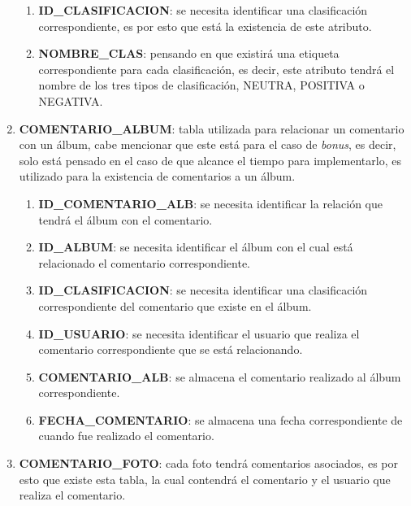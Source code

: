 \documentclass{memoria}
\begin{document}
\begin{enumerate}
	\begin{enumerate}
	\item \textbf{ID\_CLASIFICACION}: se necesita identificar una clasificación correspondiente, es por esto que está la existencia de este atributo.
	\item \textbf{NOMBRE\_CLAS}: pensando en que existirá una etiqueta correspondiente para cada clasificación, es decir, este atributo tendrá el nombre de los tres tipos de clasificación, NEUTRA, POSITIVA o NEGATIVA.
	\end{enumerate}
	
\item \textbf{COMENTARIO\_ALBUM}: tabla utilizada para relacionar un comentario con un álbum, cabe mencionar que este está para el caso de \textsl{bonus}, es decir, solo está pensado en el caso de que alcance el tiempo para implementarlo, es utilizado para la existencia de comentarios a un álbum.

	\begin{enumerate}
	\item \textbf{ID\_COMENTARIO\_ALB}: se necesita identificar la relación que tendrá el álbum con el comentario.
	\item \textbf{ID\_ALBUM}: se necesita identificar el álbum con el cual está relacionado el comentario correspondiente.
	\item \textbf{ID\_CLASIFICACION}: se necesita identificar una clasificación correspondiente del comentario que existe en el álbum.
	\item \textbf{ID\_USUARIO}: se necesita identificar el usuario que realiza el comentario correspondiente que se está relacionando.
	\item \textbf{COMENTARIO\_ALB}: se almacena el comentario realizado al álbum correspondiente.
	\item \textbf{FECHA\_COMENTARIO}: se almacena una fecha correspondiente de cuando fue realizado el comentario.
	\end{enumerate}
	
\item \textbf{COMENTARIO\_FOTO}: cada foto tendrá comentarios asociados, es por esto que existe esta tabla, la cual contendrá el comentario y el usuario que realiza el comentario.


\end{enumerate}
\end{document}
